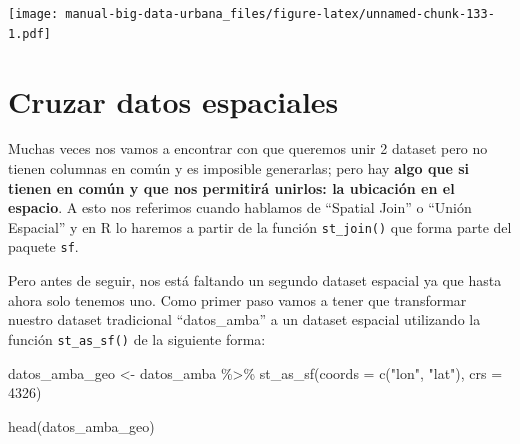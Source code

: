 \documentclass[
  spanish,
]{book}
\newenvironment{Shaded}{\begin{snugshade}}{\end{snugshade}}
\newcommand{\AttributeTok}[1]{\textcolor[rgb]{0.77,0.63,0.00}{#1}}
\newcommand{\DecValTok}[1]{\textcolor[rgb]{0.00,0.00,0.81}{#1}}
\newcommand{\FunctionTok}[1]{\textcolor[rgb]{0.00,0.00,0.00}{#1}}
\newcommand{\NormalTok}[1]{#1}
\newcommand{\OtherTok}[1]{\textcolor[rgb]{0.56,0.35,0.01}{#1}}
\newcommand{\SpecialCharTok}[1]{\textcolor[rgb]{0.00,0.00,0.00}{#1}}
\newcommand{\StringTok}[1]{\textcolor[rgb]{0.31,0.60,0.02}{#1}}
\begin{document}
\texttt{[image: manual-big-data-urbana\_files/figure-latex/unnamed-chunk-133-1.pdf]}

\hypertarget{cruzar-datos-espaciales}{%
\section{Cruzar datos espaciales}\label{cruzar-datos-espaciales}}

Muchas veces nos vamos a encontrar con que queremos unir 2 dataset pero no tienen columnas en común y es imposible generarlas; pero hay \textbf{algo que si tienen en común y que nos permitirá unirlos: la ubicación en el espacio}. A esto nos referimos cuando hablamos de ``Spatial Join'' o ``Unión Espacial'' y en R lo haremos a partir de la función \texttt{st\_join()} que forma parte del paquete \texttt{sf}.

Pero antes de seguir, nos está faltando un segundo dataset espacial ya que hasta ahora solo tenemos uno. Como primer paso vamos a tener que transformar nuestro dataset tradicional ``datos\_amba'' a un dataset espacial utilizando la función \texttt{st\_as\_sf()} de la siguiente forma:

\begin{Shaded}
\begin{Highlighting}[]
\NormalTok{datos\_amba\_geo }\OtherTok{\textless{}{-}}\NormalTok{ datos\_amba }\SpecialCharTok{\%\textgreater{}\%} 
    \FunctionTok{st\_as\_sf}\NormalTok{(}\AttributeTok{coords =} \FunctionTok{c}\NormalTok{(}\StringTok{"lon"}\NormalTok{, }\StringTok{"lat"}\NormalTok{), }\AttributeTok{crs =} \DecValTok{4326}\NormalTok{)}
\end{Highlighting}
\end{Shaded}

\begin{Shaded}
\begin{Highlighting}[]
\FunctionTok{head}\NormalTok{(datos\_amba\_geo)}
\end{Highlighting}
\end{Shaded}
\end{document}
